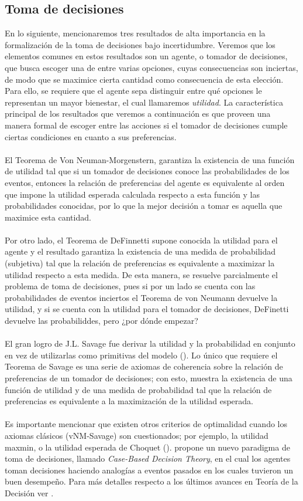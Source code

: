\documentclass[11pt]{article}
\theoremstyle{plain}
\begin{document}
\subsection{Toma de decisiones}
En lo siguiente, mencionaremos tres resultados de alta importancia en la formalización de la toma de decisiones bajo incertidumbre. Veremos que los elementos comunes en estos resultados son un agente, o tomador de decisiones, que busca escoger una de entre varias opciones, cuyas consecuencias son inciertas, de modo que se maximice cierta cantidad como consecuencia de esta elección. Para ello, se requiere que el agente sepa distinguir entre qué opciones le representan un mayor bienestar, el cual llamaremos \textit{utilidad}. La característica principal de los resultados que veremos a continuación es que proveen una manera formal de escoger entre las acciones si el tomador de decisiones cumple ciertas condiciones en cuanto a sus preferencias.\\
\\
\indent El Teorema de Von Neuman-Morgenstern, garantiza la existencia de una función de utilidad tal que si un tomador de decisiones conoce las probabilidades de los eventos, entonces la relación de preferencias del agente es equivalente al orden que impone la utilidad esperada calculada respecto a esta función y las probabilidades conocidas, por lo que la mejor decisión a tomar es aquella que maximice esta cantidad.\\
\\
\indent Por otro lado, el Teorema de DeFinnetti supone conocida la utilidad para el agente y el resultado garantiza la existencia de una medida de probabilidad (subjetiva) tal que la relación de preferencias es equivalente a maximizar la utilidad respecto a esta medida. De esta manera, se resuelve parcialmente el problema de toma de decisiones, pues si por un lado se cuenta con las probabilidades de eventos inciertos el Teorema de von Neumann devuelve la utilidad, y si se cuenta con la utilidad para el tomador de decisiones, DeFinetti devuelve las probabiliddes, pero ¿por dónde empezar? \\
\\
\indent El gran logro de J.L. Savage fue derivar  la utilidad y la probabilidad en conjunto en vez de utilizarlas como primitivas del modelo (\cite{gilboa2009decision}). Lo único que requiere el Teorema de Savage es una serie de axiomas de coherencia sobre la relación de preferencias de un tomador de decisiones; con esto, muestra la existencia de una función de utilidad y de una medida de probabilidad tal que la relación de preferencias es equivalente a la maximización de la utilidad esperada.\\
\\
 \indent Es importante mencionar que existen otros criterios de optimalidad cuando los axiomas clásicos (vNM-Savage) son cuestionados; por ejemplo, la utilidad maxmin, o la utilidad esperada de Choquet (\cite{gilboa2009decision}). \cite{gilboa2001theory} propone un nuevo paradigma de toma de decisiones, llamado \textit{Case-Based Decision Theory}, en el cual los agentes toman decisiones haciendo analogías a eventos pasados en los cuales tuvieron un buen desempeño. Para más detalles respecto a los últimos avances en Teoría de la Decisión ver \cite{wakker2010prospect}.
\end{document}
